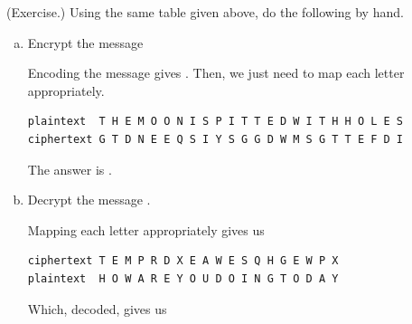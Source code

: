 \documentclass[letterpaper]{article}
\begin{document}
\begin{mdframed}
    (Exercise.) Using the same table given above, do the following by hand. 

    \begin{enumerate}[(a)]
        \item Encrypt the message 
        \begin{mdframed}
            Encoding the message gives . Then, we just need to map each letter appropriately. 
            \begin{verbatim}
plaintext  T H E M O O N I S P I T T E D W I T H H O L E S
ciphertext G T D N E E Q S I Y S G G D W M S G T T E F D I\end{verbatim}
            The answer is .
        \end{mdframed}

        \item Decrypt the message .
        \begin{mdframed}
            Mapping each letter appropriately gives us
            \begin{verbatim}
ciphertext T E M P R D X E A W E S Q H G E W P X
plaintext  H O W A R E Y O U D O I N G T O D A Y\end{verbatim}
            Which, decoded, gives us 
        \end{mdframed}
    \end{enumerate}
\end{mdframed}
\end{document}
